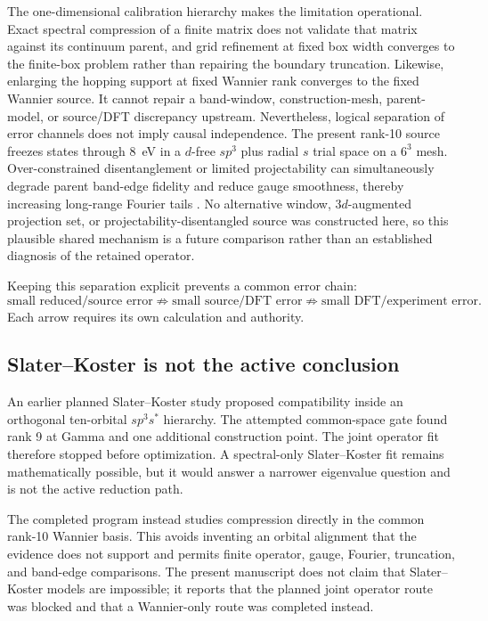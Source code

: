 \documentclass[11pt]{article}
\theoremstyle{definition}
\begin{document}
The one-dimensional calibration hierarchy makes the limitation operational.  Exact
spectral compression of a finite matrix does not validate that matrix against its
continuum parent, and grid refinement at fixed box width converges to the finite-box
problem rather than repairing the boundary truncation.  Likewise, enlarging the hopping
support at fixed Wannier rank converges to the fixed Wannier source.  It cannot repair a
band-window, construction-mesh, parent-model, or source/DFT discrepancy upstream.
Nevertheless, logical separation of error channels does not imply causal independence.
The present rank-10 source freezes states through 8~eV in a $d$-free $sp^3$ plus radial
$s$ trial space on a $6^3$ mesh.  Over-constrained disentanglement or limited
projectability can simultaneously degrade parent band-edge fidelity and reduce gauge
smoothness, thereby increasing long-range Fourier tails
\cite{vitale2020,qiao2023}.  No alternative window, $3d$-augmented projection set, or
projectability-disentangled source was constructed here, so this plausible shared
mechanism is a future comparison rather than an established diagnosis of the retained
operator.

Keeping this separation explicit prevents a common error chain:
\begin{equation*}
 \text{small reduced/source error}
 \not\Rightarrow
 \text{small source/DFT error}
 \not\Rightarrow
 \text{small DFT/experiment error}.
\end{equation*}
Each arrow requires its own calculation and authority.

\subsection{Slater--Koster is not the active conclusion}

An earlier planned Slater--Koster study proposed compatibility inside an orthogonal
ten-orbital $sp^3s^*$ hierarchy.  The attempted common-space gate found rank 9 at
Gamma and one additional construction point.  The joint operator fit therefore stopped
before optimization.  A spectral-only Slater--Koster fit remains mathematically possible,
but it would answer a narrower eigenvalue question and is not the active reduction path.

The completed program instead studies compression directly in the common rank-10
Wannier basis.  This avoids inventing an orbital alignment that the evidence does not
support and permits finite operator, gauge, Fourier, truncation, and band-edge comparisons.
The present manuscript does not claim that Slater--Koster models are impossible; it
reports that the planned joint operator route was blocked and that a Wannier-only route
was completed instead.
\end{document}
